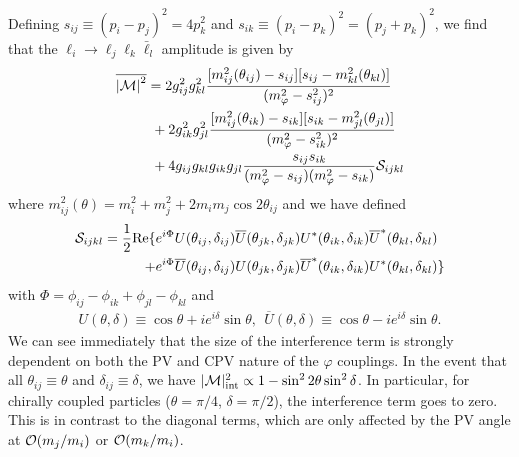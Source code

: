 {Defining $s_{ij} \equiv (p_i - p_j)^2 = 4p_k^2$ and $s_{ik} \equiv (p_i - p_k)^2 = (p_j+p_k)^2$, we find that the $\ell_i \rightarrow \ell_j\ell_k\bar{\ell}_l$ amplitude is given by
\begin{align}
    \overline{\left|{\cal M}\right|^2} &= 2g_{ij}^2g_{kl}^2\frac{[m_{ij}^2(\theta_{ij}) - s_{ij}][s_{ij}-m_{kl}^2(\theta_{kl})]}{(m_\varphi^2 - s_{ij}^2)^2}\nonumber\\
    &\ + 2g_{ik}^2g_{jl}^2\frac{[m_{ij}^2(\theta_{ik}) - s_{ik}][s_{ik}-m_{jl}^2(\theta_{jl})]}{(m_\varphi^2-s_{ik}^2)^2}\nonumber\\
    &\ +4g_{ij}g_{kl}g_{ik}g_{jl}\frac{s_{ij}s_{ik}}{(m_\varphi^2-s_{ij})(m_\varphi^2-s_{ik})}{\cal S}_{ijkl}
\end{align}
where $m_{ij}^2(\theta) = m_i^2+m_j^2 + 2m_im_j\cos{2\theta}_{ij}$ and we have defined
\begin{align}
    {\cal S}_{ijkl} = \frac{1}{2}{\rm Re}\{&e^{i\Phi}U(\theta_{ij},\delta_{ij})\overline{U}(\theta_{jk},\delta_{jk})U^*(\theta_{ik},\delta_{ik})\overline{U}^*(\theta_{kl},\delta_{kl})\nonumber\\
   +&e^{i\Phi}\overline{U}(\theta_{ij},\delta_{ij})U(\theta_{jk},\delta_{jk})\overline{U}^*(\theta_{ik},\delta_{ik})U^*(\theta_{kl},\delta_{kl})\}
\end{align}
with $\Phi = \phi_{ij}-\phi_{ik}+\phi_{jl}-\phi_{kl}$ and
\begin{align}
    U(\theta,\delta) \equiv \cos{\theta}+ie^{i\delta}\sin{\theta},\ \ \overline{U}(\theta,\delta) \equiv \cos{\theta}-ie^{i\delta}\sin{\theta}.
\end{align}
We can see immediately that the size of the interference term is strongly dependent on both the PV and CPV nature of the $\varphi$ couplings. In the event that all $\theta_{ij} \equiv \theta$ and $\delta_{ij} \equiv \delta$, we have $|{\cal M}|^2_{\rm int} \propto 1-\sin^2{2\theta}\sin^2{\delta}$. In particular, for chirally coupled particles ($\theta = \pi/4$, $\delta = \pi/2$), the interference term goes to zero. This is in contrast to the diagonal terms, which are only affected by the PV angle at ${\cal O}(m_j/m_i)$ or ${\cal O}(m_k/m_i)$. 


}
